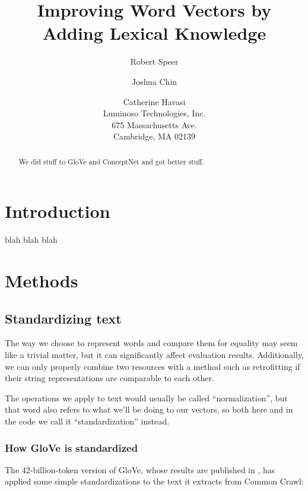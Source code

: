 \documentclass[letterpaper]{article}
\title{Improving Word Vectors by Adding Lexical Knowledge}
\author{Robert Speer \and Joshua Chin \and Catherine Havasi\\
    Luminoso Technologies, Inc.\\
    675 Massachusetts Ave.\\
    Cambridge, MA 02139
}
\begin{document}
\maketitle
\begin{abstract}
We did stuff to GloVe and ConceptNet and got better stuff.
\end{abstract}

\section{Introduction}
blah blah blah

\section{Methods}

\subsection{Standardizing text}


The way we choose to represent words and compare them for equality may seem
like a trivial matter, but it can significantly affect evaluation results.
Additionally, we can only properly combine two resources with a method such
as retrofitting if their string representations are comparable to each other.

The operations we apply to text would usually be called ``normalization'',
but that word also refers to what we'll be doing to our vectors, so both
here and in the code we call it ``standardization'' instead.

\subsubsection{How GloVe is standardized}

The 42-billion-token version of GloVe, whose results are published in
\cite{pennington2014glove}, has applied some simple standardizations
to the text it extracts from Common Crawl:
\end{document}

